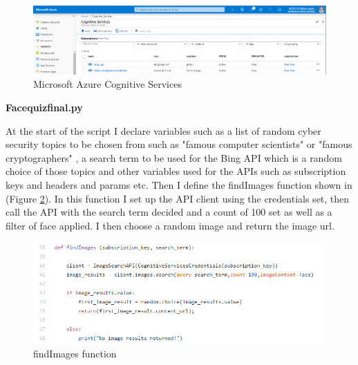 \documentclass[12pt,a4paper]{article}
\begin{document}
\begin{figure}[h]
    \centering
    \includegraphics[width=1.0\textwidth]{Figs/Azure.PNG} 
    \caption{Microsoft Azure Cognitive Services} 
    \label{Azure}
\end{figure}

\textbf{Face\textunderscore quiz\textunderscore final.py} 

At the start of the script I declare variables such as a list of random cyber security topics to be chosen from such as "famous computer scientists" or "famous cryptographers" , a search term to be used for the Bing API which is a random choice of those topics and other variables used for the APIs such as subscription keys and headers and params etc. Then I define the findImages function shown in (Figure \ref{findimages}). In this function I set up the API client using the credentials set, then call the API with the search term decided and a count of 100 set as well as a filter of face applied. I then choose a random image and return the image url. 

\begin{figure}[h]
    \centering
    \includegraphics[width=1.0\textwidth]{Figs/findimages.PNG} 
    \caption{findImages function} 
    \label{findimages}
\end{figure}  
\end{document}
